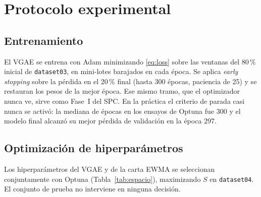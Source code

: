 \documentclass[11pt,a4paper]{article}
\begin{document}
\section{Protocolo experimental}

\subsection{Entrenamiento}

El VGAE se entrena con Adam minimizando \eqref{eq:loss} sobre las ventanas del
80\,\% inicial de \texttt{dataset03}, en mini-lotes barajados en cada época. Se
aplica \emph{early stopping} sobre la pérdida en el 20\,\% final (hasta 300 épocas,
paciencia de 25) y se restauran los pesos de la mejor época. Ese mismo tramo,
que el optimizador nunca ve, sirve como Fase~I del SPC. En la práctica el criterio de
parada casi nunca se activó: la mediana de épocas en los ensayos de Optuna fue 300 y
el modelo final alcanzó su mejor pérdida de validación en la época 297.

\subsection{Optimización de hiperparámetros}

Los hiperparámetros del VGAE y de la carta EWMA se seleccionan conjuntamente con
Optuna (Tabla~\ref{tab:espacio}), maximizando $S$ en \texttt{dataset04}. El
conjunto de prueba no interviene en ninguna decisión.
\end{document}
